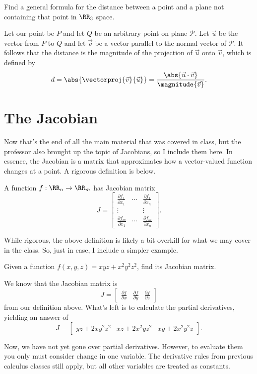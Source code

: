 \begin{example}
    Find a general formula for the distance between a point and a plane not containing that point in $\RR_{3}$ space.

    \begin{soln}
        Let our point be $P$ and let $Q$ be an arbitrary point on plane $\mathcal{P}$. Let $\vec{u}$ be the vector from $P$ to $Q$ and let $\vec{v}$ be a vector parallel to the normal vector of $\mathcal{P}$. It follows that the distance is the magnitude of the projection of $\vec{u}$ onto $\vec{v}$, which is defined by
        \[d = \abs{\vectorproj{\vec{v}}{\vec{u}}} = \frac{\abs{\vec{u} \cdot \vec{v}}}{\magnitude{\vec{v}}}.\]
    \end{soln}
\end{example}

\section{The Jacobian}

Now that's the end of all the main material that was covered in class, but the professor also brought up the topic of Jacobians, so I include them here. In essence, the Jacobian is a matrix that approximates how a vector-valued function changes at a point. A rigorous definition is below.

\begin{definition}
    A function $f : \RR_{n} \to \RR_{m}$ has Jacobian matrix
    \[J = \begin{bmatrix}
        \frac{\partial f_{1}}{\partial x_{1}} & \cdots & \frac{\partial f_{1}}{\partial x_{n}} \\
        \vdots & & \vdots \\
        \frac{\partial f_{m}}{\partial x_{1}} & \cdots & \frac{\partial f_{m}}{\partial x_{n}}
    \end{bmatrix}.\]
\end{definition}

While rigorous, the above definition is likely a bit overkill for what we may cover in the class. So, just in case, I include a simpler example.

\begin{example}
    Given a function $f(x, y, z) = xyz + x^{2}y^{2}z^{2}$, find its Jacobian matrix.

    \begin{soln}
        We know that the Jacobian matrix is
        \[J = \begin{bmatrix}
            \frac{\partial f}{\partial x} & \frac{\partial f}{\partial y} & \frac{\partial f}{\partial z}
        \end{bmatrix}\]
        from our definition above. What's left is to calculate the partial derivatives, yielding an answer of
        \[J = \begin{bmatrix}
            yz + 2xy^{2}z^{2} & xz + 2x^{2}yz^{2} & xy + 2x^{2}y^{2}z
        \end{bmatrix}.\]
    \end{soln}
\end{example}

\begin{remark}
    Now, we have not yet gone over partial derivatives. However, to evaluate them you only must consider change in one variable. The derivative rules from previous calculus classes still apply, but all other variables are treated as constants.
\end{remark}